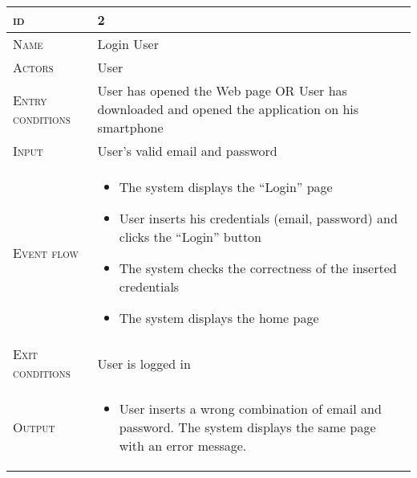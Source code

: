 \begin{table}[H]
    \centering
    \begin{tabular}[c]{|l|p{}|}
        \hline %
    	\textsc{id}                 &   2\\
    	\hline %
    	\textsc{Name}               &   Login User\\
    	\hline %
    	\textsc{Actors}             &   User\\
    	\hline %
    	\textsc{Entry conditions}   &   User has opened the Web page OR User has downloaded and opened the application on his smartphone\\
    	\hline %
    	\textsc{Input}   &   User’s valid email and password\\
    	\hline %
    	\textsc{Event flow}         &   \footnotesize
            	                        \begin{itemize}
                                    	    \item The system displays the “Login” page
                                            \item User inserts his credentials (email, password) and clicks the “Login” button
                                            \item The system checks the correctness of the inserted credentials
                                            \item The system displays the home page


                                        \end{itemize}\\
        \hline %
        \textsc{Exit conditions}    &  User is logged in\\
    	\hline %
    	\textsc{Output}             &  \begin{itemize}
    	    \item User inserts a wrong combination of email and password. The system displays the same page with an error message.


\end{itemize}
\end{tabular}
\end{table}
